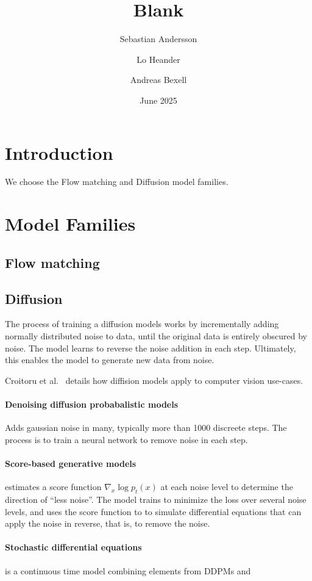 \documentclass{article}
\title{Blank}
\author{Sebastian Andersson \and Lo Heander \and Andreas Bexell}
\date{June 2025}
\begin{document}
\maketitle

\section{Introduction}

We choose the Flow matching and Diffusion model families. 

\section{Model Families}

\subsection{Flow matching}

\subsection{Diffusion}

The process of training a diffusion models works by incrementally adding normally distributed noise to data, until the original data is entirely obscured by noise.
The model learns to reverse the noise addition in each step. Ultimately, this enables the model to generate new data from noise.

Croitoru et al.~\cite{croitoru2023diffusion} details how diffision models apply to computer vision use-cases.

\paragraph{Denoising diffusion probabalistic models} Adds gaussian noise in many, typically more than 1000 discreete steps. The process is to train a neural network to remove noise in each step.

\paragraph{Score-based generative models} estimates a score function $\nabla_x \log p_t(x)$ at each noise level to determine the direction of ``less noise''. The model trains to minimize the loss over several noise levels, and uses the score function to to simulate differential equations that can apply the noise in reverse, that is, to remove the noise.

\paragraph{Stochastic differential equations} is a continuous time model combining elements from DDPMs and 



\end{document}
